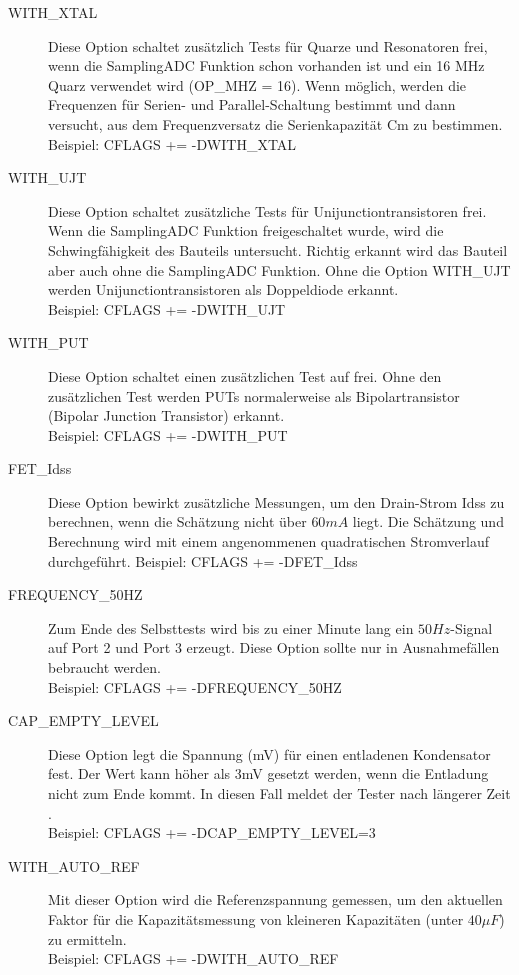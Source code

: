 \begin{description}
  \item[WITH\_XTAL]
Diese Option schaltet zusätzlich Tests für Quarze und Resonatoren frei, wenn die SamplingADC Funktion schon vorhanden ist
und ein 16 MHz Quarz verwendet wird (OP\_MHZ = 16).
Wenn möglich, werden die Frequenzen für Serien- und Parallel-Schaltung bestimmt und dann versucht,
aus dem Frequenzversatz die Serienkapazität Cm zu bestimmen.\\
Beispiel: CFLAGS += -DWITH\_XTAL

  \item[WITH\_UJT]
Diese Option schaltet zusätzliche Tests für Unijunctiontransistoren frei. 
Wenn die SamplingADC Funktion freigeschaltet wurde, wird die Schwingfähigkeit des Bauteils untersucht.
Richtig erkannt wird das Bauteil aber auch ohne die SamplingADC Funktion. 
Ohne die Option WITH\_UJT werden Unijunctiontransistoren als Doppeldiode erkannt.\\
Beispiel: CFLAGS += -DWITH\_UJT

  \item[WITH\_PUT]
  Diese Option schaltet einen zusätzlichen Test auf  frei.
Ohne den zusätzlichen Test werden PUTs normalerweise als Bipolartransistor (Bipolar Junction Transistor) erkannt.\\
Beispiel: CFLAGS += -DWITH\_PUT

 \item[FET\_Idss]
Diese Option bewirkt zusätzliche Messungen, um den Drain-Strom Idss zu berechnen, wenn die Schätzung nicht
über \(60mA\) liegt. Die Schätzung und Berechnung wird mit einem angenommenen quadratischen Stromverlauf durchgeführt.
Beispiel: CFLAGS += -DFET\_Idss

  \item[FREQUENCY\_50HZ] Zum Ende des Selbsttests wird bis zu einer Minute lang ein \(50Hz\)-Signal auf Port 2 und Port 3 erzeugt.
Diese Option sollte nur in Ausnahmefällen bebraucht werden.\\
Beispiel: CFLAGS += -DFREQUENCY\_50HZ

  \item[CAP\_EMPTY\_LEVEL] Diese Option legt die Spannung (mV) für einen entladenen Kondensator fest.
  Der Wert kann höher als 3mV gesetzt werden, wenn die Entladung nicht zum Ende kommt. In diesen Fall meldet der Tester nach längerer Zeit .\\
Beispiel: CFLAGS += -DCAP\_EMPTY\_LEVEL=3

  \item[WITH\_AUTO\_REF] Mit dieser Option wird die Referenzspannung gemessen, um den aktuellen Faktor für die Kapazitätsmessung 
von kleineren Kapazitäten (unter \(40\mu F\)) zu ermitteln.\\
Beispiel: CFLAGS += -DWITH\_AUTO\_REF


\end{description}
